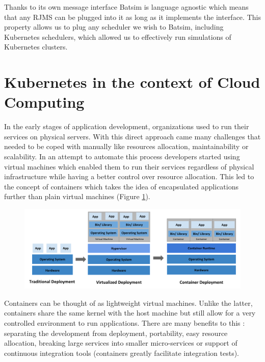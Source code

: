 Thanks to its own message interface Batsim is language agnostic which means
that any RJMS can be plugged into it as long as it implements the interface.
This property allows us to plug any scheduler we wish to Batsim, including
Kubernetes schedulers, which allowed us to effectively run simulations of
Kubernetes clusters.

\section{Kubernetes in the context of Cloud Computing}

In the early stages of application development, organizations used to run their
services on physical servers. With this direct approach came many challenges
that needed to be coped with manually like resources allocation,
maintainability or scalability. In an attempt to automate this process
developers started using virtual machines which enabled them to run their
services regardless of physical infrastructure while having a better control
over resource allocation.  This led to the concept of containers which takes
the idea of encapsulated applications further than plain virtual machines
(Figure \ref{fig:container-evolution}).

\begin{figure}[h]
	\centering
	\includegraphics[width=\textwidth]{./imgs/container_evolution.png}
	\label{fig:container-evolution}
\end{figure}

Containers can be thought of as lightweight virtual machines. Unlike the
latter, containers share the same kernel with the host machine but still allow
for a very controlled environment to run applications. There are many
benefits to this : separating the development from deployment, portability,
easy resource allocation, breaking large services into smaller micro-services
or support of continuous integration tools (containers greatly facilitate
integration tests).\\

